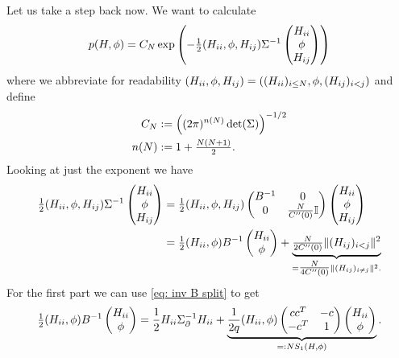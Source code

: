 Let us take a step back now. We want to calculate
\begin{equation*}
	p(H, \phi)
	=C_N\exp\left(
		-\tfrac12
		( H_{ii},\phi, H_{ij} )\Sigma^{-1}
		\begin{pmatrix}
			H_{ii}\\
			\phi\\
			H_{ij}
		\end{pmatrix}
	\right)
\end{equation*}
where we abbreviate for readability \((H_{ii}, \phi, H_{ij})= ((H_{ii})_{i\le
N}, \phi, (H_{ij})_{i<j})\) and define
\begin{align*}
	C_N &:= \left((2\pi)^{n(N)}\det(\Sigma)\right)^{-1/2}\\
	n(N) &:= 1 + \tfrac{N(N+1)}{2}.
\end{align*}
Looking at just the exponent we have
\begin{align*}
		\tfrac12
		( H_{ii},\phi, H_{ij} )\Sigma^{-1}
		\begin{pmatrix}
			H_{ii}\\
			\phi\\
			H_{ij}
		\end{pmatrix}
		&= 
		\tfrac12
		( H_{ii},\phi, H_{ij} )\begin{pmatrix}
			B^{-1} & 0\\
			0 & \tfrac{N}{C''(0)}\mathbb{I}
		\end{pmatrix}
		\begin{pmatrix}
			H_{ii}\\
			\phi\\
			H_{ij}
		\end{pmatrix}\\
		&= \tfrac12(H_{ii},\phi)B^{-1}\begin{pmatrix}
			H_{ii}\\ \phi
		\end{pmatrix}
		+ \underbrace{\tfrac{N}{2C''(0)}\| (H_{ij})_{i<j}\|^2}_{
			=\tfrac{N}{4C''(0)}\| (H_{ij})_{i\neq j}\|^2.
		}
\end{align*}
For the first part we can use \eqref{eq: inv B split} to get
\[
		\tfrac12(H_{ii},\phi)B^{-1}\begin{pmatrix}
			H_{ii}\\ \phi
		\end{pmatrix}
		= \frac12 
			H_{ii} \Sigma_\partial^{-1} H_{ii}
			+
			\underbrace{
				\frac1{2q}
				(H_{ii},\phi)
				\begin{pmatrix}
					cc^T & -c \\
					-c^T & 1
				\end{pmatrix}
				\begin{pmatrix}
					H_{ii}\\ \phi
				\end{pmatrix}
			}_{=: N S_1(H, \phi)}.
\]
